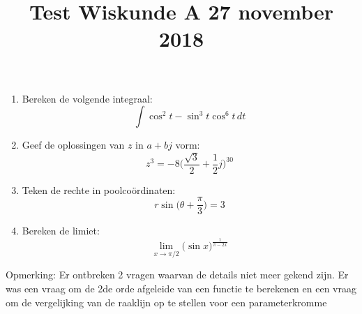 \documentclass{article}
\def\warning#1{\color{red} #1 \color{black}}
\begin{document}
\title{Test Wiskunde A 27 november 2018}
\date{}
\author{}
\maketitle

\begin{enumerate}
	\item {Bereken de volgende integraal: $$\int \cos^2t - \sin^3t\cos^6t\,dt$$}
	\item {Geef de oplossingen van $z$ in $a + bj$ vorm: $$z^3 = -8\bigg(\frac{\sqrt{3}}{2} + \frac{1}{2}j\bigg)^{30}$$}
	\item {Teken de rechte in poolcoördinaten: $$r\sin\bigg(\theta + \frac{\pi}{3}\bigg) = 3$$}
	\item {Bereken de limiet: $$\lim_{x \to \pi/2} \bigg(\sin x \bigg)^{\frac{1}{\pi - 2x}}$$}
\end{enumerate}
\warning{Opmerking: Er ontbreken 2 vragen waarvan de details niet meer gekend zijn. Er was een vraag om de 2de orde afgeleide van een functie te berekenen en een vraag om de vergelijking van de raaklijn op te stellen voor een parameterkromme }
\end{document}
